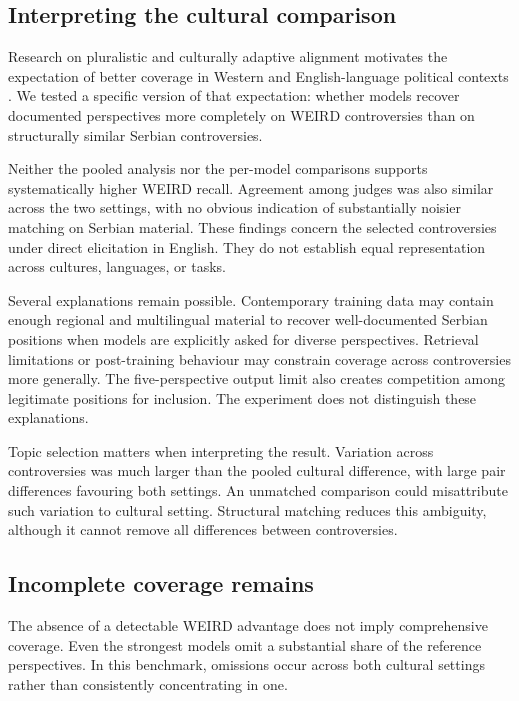 \documentclass[11pt,a4paper]{article}
\begin{document}
\subsection{Interpreting the cultural comparison}
\label{sec:What the null result means}
Research on pluralistic and culturally adaptive alignment motivates the expectation of better coverage in Western and English-language political contexts \cite{sorensenRoadmapPluralisticAlignment2024, fengModularPluralismPluralistic2024, wangMultilingualPromptingImproving2025}. We tested a specific version of that expectation: whether models recover documented perspectives more completely on WEIRD controversies than on structurally similar Serbian controversies.

Neither the pooled analysis nor the per-model comparisons supports systematically higher WEIRD recall. Agreement among judges was also similar across the two settings, with no obvious indication of substantially noisier matching on Serbian material. These findings concern the selected controversies under direct elicitation in English. They do not establish equal representation across cultures, languages, or tasks.

Several explanations remain possible. Contemporary training data may contain enough regional and multilingual material to recover well-documented Serbian positions when models are explicitly asked for diverse perspectives. Retrieval limitations or post-training behaviour may constrain coverage across controversies more generally. The five-perspective output limit also creates competition among legitimate positions for inclusion. The experiment does not distinguish these explanations.

Topic selection matters when interpreting the result. Variation across controversies was much larger than the pooled cultural difference, with large pair differences favouring both settings. An unmatched comparison could misattribute such variation to cultural setting. Structural matching reduces this ambiguity, although it cannot remove all differences between controversies.

\subsection{Incomplete coverage remains}
\label{sec:Incomplete coverage remains the main problem}
The absence of a detectable WEIRD advantage does not imply comprehensive coverage. Even the strongest models omit a substantial share of the reference perspectives. In this benchmark, omissions occur across both cultural settings rather than consistently concentrating in one.
\end{document}
